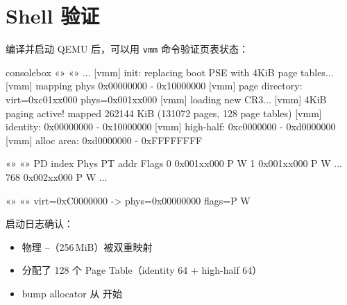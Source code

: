 \section{Shell 验证}

编译并启动 QEMU 后，可以用 \texttt{vmm} 命令验证页表状态：

\begin{tcblisting}{consolebox}
«\tps{\$}» «»
...
[vmm] init: replacing boot PSE with 4KiB page tables...
[vmm] mapping phys 0x00000000 - 0x10000000
[vmm] page directory: virt=0xc01xx000 phys=0x001xx000
[vmm] loading new CR3...
[vmm] 4KiB paging active! mapped 262144 KiB (131072 pages, 128 page tables)
[vmm] identity:  0x00000000 - 0x10000000
[vmm] high-half: 0xc0000000 - 0xd0000000
[vmm] alloc area: 0xd0000000 - 0xFFFFFFFF

«\tpk{>}» «»
  PD index  Phys PT addr  Flags
  0         0x001xx000    P W
  1         0x001xx000    P W
  ...
  768       0x002xx000    P W
  ...

«\tpk{>}» «»
  virt=0xC0000000 -> phys=0x00000000 flags=P W
\end{tcblisting}

启动日志确认：
\begin{itemize}
  \item 物理 --（256\,MiB）被双重映射
  \item 分配了 128 个 Page Table（identity 64 + high-half 64）
  \item bump allocator 从  开始
\end{itemize}


